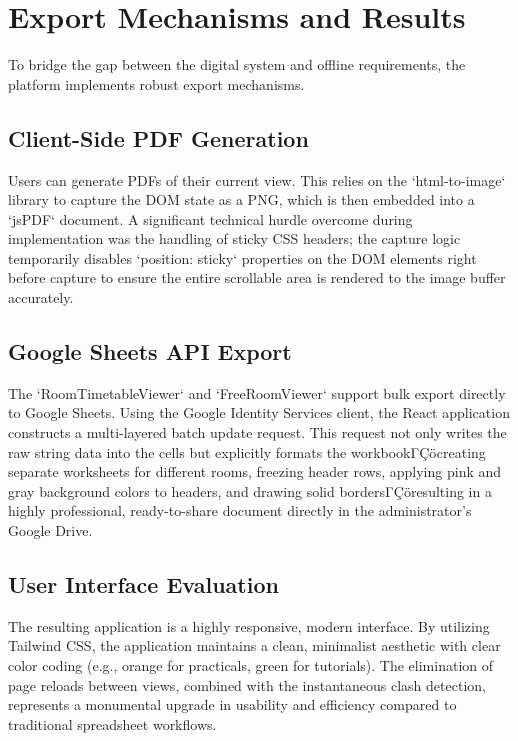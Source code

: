 \section{Export Mechanisms and Results}

To bridge the gap between the digital system and offline requirements, the platform implements robust export mechanisms.

\subsection{Client-Side PDF Generation}
Users can generate PDFs of their current view. This relies on the `html-to-image` library to capture the DOM state as a PNG, which is then embedded into a `jsPDF` document. A significant technical hurdle overcome during implementation was the handling of sticky CSS headers; the capture logic temporarily disables `position: sticky` properties on the DOM elements right before capture to ensure the entire scrollable area is rendered to the image buffer accurately.

\subsection{Google Sheets API Export}
The `RoomTimetableViewer` and `FreeRoomViewer` support bulk export directly to Google Sheets. Using the Google Identity Services client, the React application constructs a multi-layered batch update request. This request not only writes the raw string data into the cells but explicitly formats the workbookΓÇöcreating separate worksheets for different rooms, freezing header rows, applying pink and gray background colors to headers, and drawing solid bordersΓÇöresulting in a highly professional, ready-to-share document directly in the administrator's Google Drive.

\subsection{User Interface Evaluation}
The resulting application is a highly responsive, modern interface. By utilizing Tailwind CSS, the application maintains a clean, minimalist aesthetic with clear color coding (e.g., orange for practicals, green for tutorials). The elimination of page reloads between views, combined with the instantaneous clash detection, represents a monumental upgrade in usability and efficiency compared to traditional spreadsheet workflows.

